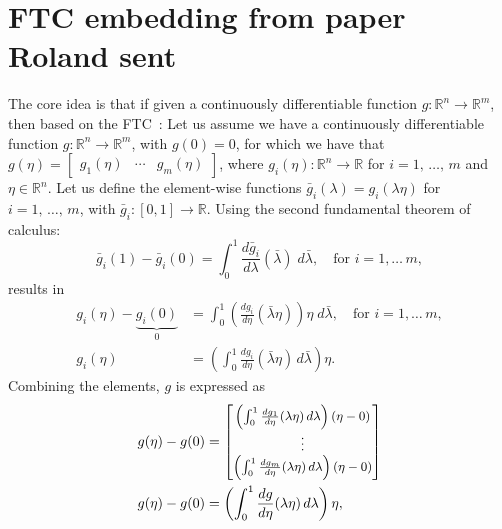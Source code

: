 \section{FTC embedding from paper Roland sent}

The core idea is that if given a continuously differentiable function $g:\mathbb{R}^n\rightarrow\mathbb{R}^m$, then based on the FTC~\cite{Koelewijn2023}:
Let us assume we have a continuously differentiable function $g:\mathbb{R}^n\rightarrow\mathbb{R}^m$, with $g(0)=0$, for which we have that $g(\eta)=\begin{bmatrix}
		g_1(\eta) & \cdots & g_m(\eta)
	\end{bmatrix}$, where $g_i(\eta):\mathbb{R}^n\rightarrow\mathbb{R}$ for $ i = 1,\,\dots,\,m$ and $\eta\in\mathbb{R}^n$. Let us define the element\nobreakdash-wise functions $\bar{g}_i(\lambda)=g_i(\lambda \eta)$ for $i = 1,\,\dots,\,m$, with $\bar{g}_i:[0,1]\rightarrow\mathbb{R}$. Using the second fundamental theorem of calculus:
\begin{equation}
	\bar{g}_i(1)-\bar{g}_i(0)=\int_0^1 \frac{d \bar{g}_i}{d\lambda}(\bar{\lambda})\;d\bar{\lambda},\quad\text{for }i=1,\dots\,m,
\end{equation}
results in
\begin{align}
	g_i(\eta)-\underbrace{g_i(0)}_0 & =\int_0^1\left(\frac{d g_i}{d\eta}(\bar{\lambda}\eta)\right)\eta \;d\bar{\lambda}, \quad\text{for }i=1,\dots\,m, \\
	g_i(\eta)                       & =\left(\int_0^1\frac{d g_i}{d\eta}(\bar{\lambda}\eta)\,d\bar{\lambda}\right)\eta.
\end{align}
Combining the elements, $g$ is expressed as
\begin{subequations}
	\begin{align}
		g(\eta)- g(0) & =                                                                                                                        %
		{\small
		\begin{bmatrix}
			\left(\int_0^1\frac{d g_1}{d\eta}({\lambda}\eta)\,d{\lambda}\right)(\eta-0) \\\vdots\\\left(\int_0^1\frac{d g_m}{d\eta}({\lambda}\eta)\,d{\lambda}\right)(\eta-0)
		\end{bmatrix}} \\
		g(\eta)- g(0) & =\left(\int_0^1\frac{d g}{d\eta}({\lambda}\eta)\,d{\lambda}\right)\eta,
	\end{align}
\end{subequations}
